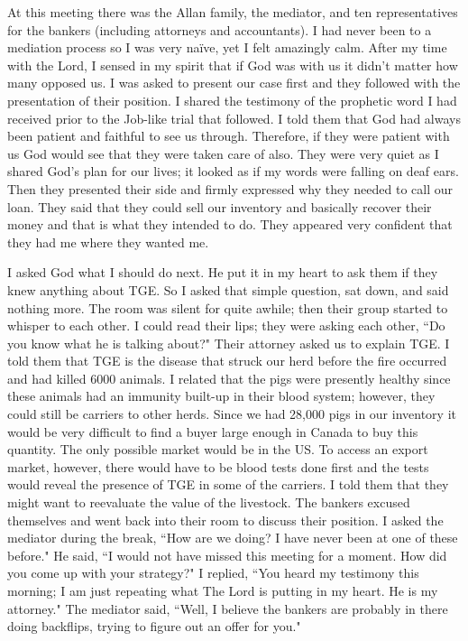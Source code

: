 \documentclass[oneside,12pt]{book}
\begin{document}
At this meeting there was the Allan family, the mediator, and ten representatives for the bankers (including attorneys and accountants). I had never been to a mediation process so I was very naïve, yet I felt amazingly calm. After my time with the Lord, I sensed in my spirit that if God was with us it didn't matter how many opposed us. I was asked to present our case first and they followed with the presentation of their position. I shared the testimony of the prophetic word I had received prior to the Job-like trial that followed. I told them that God had always been patient and faithful to see us through. Therefore, if they were patient with us God would see that they were taken care of also. They were very quiet as I shared God's plan for our lives; it looked as if my words were falling on deaf ears. Then they presented their side and firmly expressed why they needed to call our loan. They said that they could sell our inventory and basically recover their money and that is what they intended to do. They appeared very confident that they had me where they wanted me.

I asked God what I should do next. He put it in my heart to ask them if they knew anything about TGE. So I asked that simple question, sat down, and said nothing more. The room was silent for quite awhile; then their group started to whisper to each other. I could read their lips; they were asking each other, ``Do you know what he is talking about?" Their attorney asked us to explain TGE. I told them that TGE is the disease that struck our herd before the fire occurred and had killed 6000 animals. I related that the pigs were presently healthy since these animals had an immunity built-up in their blood system; however, they could still be carriers to other herds. Since we had 28,000 pigs in our inventory it would be very difficult to find a buyer large enough in Canada to buy this quantity. The only possible market would be in the US. To access an export market, however, there would have to be blood tests done first and the tests would reveal the presence of TGE in some of the carriers. I told them that they might want to reevaluate the value of the livestock. The bankers excused themselves and went back into their room to discuss their position. I asked the mediator during the break, ``How are we doing? I have never been at one of these before."  He said, ``I would not have missed this meeting for a moment. How did you come up with your strategy?" I replied, ``You heard my testimony this morning; I am just repeating what The Lord is putting in my heart. He is my attorney." The mediator said, ``Well, I believe the bankers are probably in there doing backflips, trying to figure out an offer for you."
\end{document}
